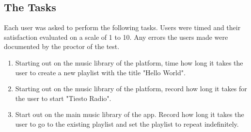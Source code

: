 \documentclass[a4paper]{article}
\begin{document}
\subsection{The Tasks}
Each user was asked to perform the following tasks. Users were timed and their satisfaction evaluated on a scale of 1 to 10. Any errors the users made were documented by the proctor of the test.
\begin{enumerate}
\item Starting out on the music library of the platform, time how long it takes the user to create a new playlist with the title "Hello World".
\item Starting out on the music library of the platform, record how long it takes for the user to start "Tiesto Radio".
\item Start out on the main music library of the app. Record how long it takes the user to go to the existing playlist and set the playlist to repeat indefinitely.
\end{enumerate}
\end{document}
